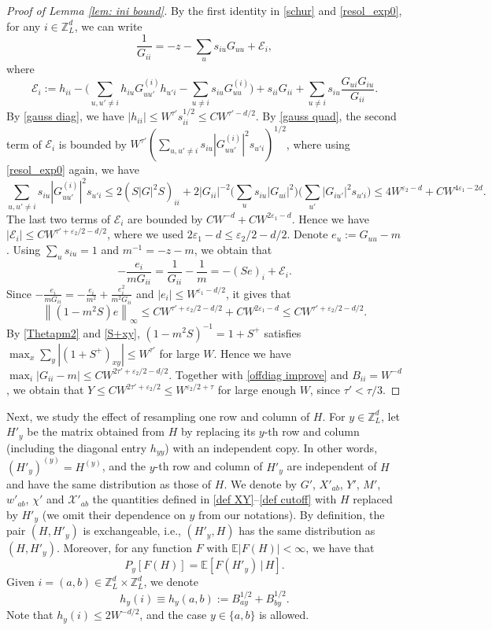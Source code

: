 \documentclass{article}
\newcommand{\1}{\mathds{1}}
\numberwithin{equation}{section}
\newcommand{\be}{\begin{equation}}
\newcommand{\ee}{\end{equation}}
\newcommand{\e}{{\varepsilon}}
\renewcommand{\cal}{\mathcal}
\renewcommand{\leq}{\leqslant}
\renewcommand{\le}{\leq}
\newcommand{\E}{\mathbb{E}}
\newcommand{\Z}{\mathbb{Z}}
\theoremstyle{plain} %
\theoremstyle{remark}
\begin{document}
\begin{proof}[Proof of Lemma \ref{lem: ini bound}]
\medskip
{} By the first identity in \eqref{schur} and \eqref{resol_exp0}, for any $i\in \Z_L^d$, we can write
$$\frac{1}{G_{ii}}=-z-\sum_{u}s_{iu}G_{uu}+\cal E_i,$$
where
$$\cal E_i:=h_{ii}-\Big(\sum_{u,u'\ne i}h_{iu}G^{(i)}_{uu'}h_{u'i}-\sum_{u\ne i}s_{iu}G^{(i)}_{uu}\Big)+s_{ii}G_{ii}+\sum_{u\ne i}s_{iu}\frac{G_{ui}G_{iu}}{G_{ii}}.$$
By \eqref{gauss diag}, we have $|h_{ii}|\le W^{\tau'}s_{ii}^{1/2}\le CW^{\tau'-d/2}$. By \eqref{gauss quad}, the second term of $\cal E_i$ is bounded by $W^{\tau'}(\sum_{u,u'\ne i}s_{iu}|G^{(i)}_{uu'}|^2s_{u'i})^{1/2}$, where using \eqref{resol_exp0} again, we have
$$\sum_{u,u'\ne i}s_{iu}|G^{(i)}_{uu'}|^2s_{u'i}\le 2(S|G|^2S)_{ii}+2|G_{ii}|^{-2}\Big(\sum_us_{iu}|G_{ui}|^2\Big)\Big(\sum_{u'}|G_{iu'}|^2s_{u'i}\Big)\le 4W^{\e_2-d}+CW^{4\e_1-2d}.$$
The last two terms of $\cal E_i$ are bounded by $CW^{-d}+CW^{2\e_1-d}$. Hence we have $|\cal E_i|\le CW^{\tau'+\e_2/2-d/2}$, where we used $2\e_1-d\le \e_2/2-d/2$. Denote $e_u:=G_{uu}-m$. Using $\sum_us_{iu}=1$ and $m^{-1}=-z-m$, we obtain that
$$-\frac{e_i}{mG_{ii}}=\frac{1}{G_{ii}}-\frac1m=-(Se)_i+\cal E_i.$$
Since $-\frac{e_i}{mG_{ii}}=-\frac{e_i}{m^2}+\frac{e_i^2}{m^2G_{ii}}$ and $|e_i|\le W^{\e_1-d/2}$, it gives that
$$\left\|(1-m^2S)e\right\|_{\infty}\le CW^{\tau'+\e_2/2-d/2}+CW^{2\e_1-d}\le CW^{\tau'+\e_2/2-d/2}.$$
By \eqref{Thetapm2} and \eqref{S+xy}, $(1-m^2S)^{-1}=1+S^+$ satisfies $\max_x\sum_y|(1+S^+)_{xy}|\le W^{\tau'}$ for large $W$. Hence we have $\max_i|G_{ii}-m|\le CW^{2\tau'+\e_2/2-d/2}$. Together with \eqref{offdiag improve} and $B_{ii}=W^{-d}$, we obtain that $Y\le CW^{2\tau'+\e_2/2}\le W^{\e_2/2+\tau}$ for large enough $W$, since $\tau'<\tau/3$.
\end{proof}

Next, we study the effect of resampling one row and column of $H$. For $y\in\Z_L^d$, let $H'_y$ be the matrix obtained from $H$ by replacing its $y$-th row and column (including the diagonal entry $h_{yy}$) with an independent copy. In other words, $(H'_y)^{(y)}=H^{(y)}$, and the $y$-th row and column of $H'_y$ are independent of $H$ and have the same distribution as those of $H$. We denote by $G'$, $X'_{ab}$, $Y'$, $M'$, $w'_{ab}$, $\chi'$ and $\cal X'_{ab}$ the quantities defined in \eqref{def XY}--\eqref{def cutoff} with $H$ replaced by $H'_y$ (we omit their dependence on $y$ from our notations). By definition, the pair $(H,H'_y)$ is exchangeable, i.e., $(H'_y,H)$ has the same distribution as $(H,H'_y)$. Moreover, for any function $F$ with $\E|F(H)|<\infty$, we have that
\be\label{Py resample}
P_y\left[F(H)\right]=\E\left[F(H'_y)\,|\,H\right].
\ee
Given $i=(a,b)\in \Z_L^d\times \Z_L^d$, we denote
\be\label{def hy}
h_y(i)\equiv h_y(a,b):=B^{1/2}_{ay}+B^{1/2}_{by}.
\ee
Note that $h_y(i)\le 2W^{-d/2}$, and the case $y\in\{a,b\}$ is allowed.
\end{document}
